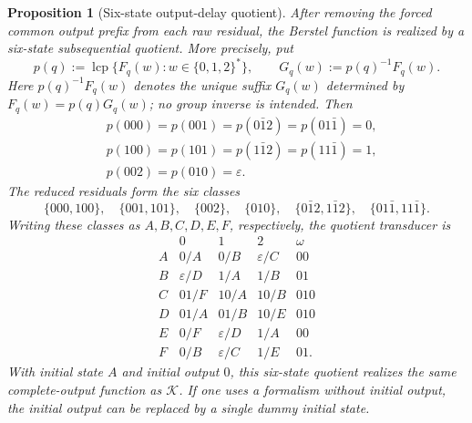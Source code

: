 \documentclass[11pt,letterpaper]{article}
\numberwithin{equation}{section}
\theoremstyle{plain}
\newtheorem{proposition}[theorem]{Proposition}
\theoremstyle{definition}
\theoremstyle{remark}
\DeclareMathOperator{\lcp}{lcp}
\begin{document}
\begin{proposition}[Six-state output-delay quotient]\label{prop:berstel-six-state-quotient}
After removing the forced common output prefix from each raw residual, the
Berstel function is realized by a six-state subsequential quotient.  More
precisely, put
\[
p(q):=\lcp\{F_q(w):w\in\{0,1,2\}^\ast\},
\qquad
G_q(w):=p(q)^{-1}F_q(w).
\]
Here $p(q)^{-1}F_q(w)$ denotes the unique suffix $G_q(w)$ determined by
$F_q(w)=p(q)G_q(w)$; no group inverse is intended.
Then
\[
\begin{aligned}
&p(000)=p(001)=p(0\bar{1}2)=p(01\bar{1})=0,\\
&p(100)=p(101)=p(1\bar{1}2)=p(11\bar{1})=1,\\
&p(002)=p(010)=\varepsilon.
\end{aligned}
\]
The reduced residuals form the six classes
\[
\{000,100\},\quad
\{001,101\},\quad
\{002\},\quad
\{010\},\quad
\{0\bar{1}2,1\bar{1}2\},\quad
\{01\bar{1},11\bar{1}\}.
\]
Writing these classes as $A,B,C,D,E,F$, respectively, the quotient
transducer is
\[
\begin{array}{c|ccc|c}
&0&1&2&\omega\\
\hline
A &0/A&0/B&\varepsilon/C&00\\
B &\varepsilon/D&1/A&1/B&01\\
C &01/F&10/A&10/B&010\\
D &01/A&01/B&10/E&010\\
E &0/F&\varepsilon/D&1/A&00\\
F &0/B&\varepsilon/C&1/E&01 .
\end{array}
\]
With initial state $A$ and initial output $0$, this six-state quotient
realizes the same complete-output function as $\mathcal K$.  If one uses a
formalism without initial output, the initial output can be replaced by a
single dummy initial state.
\end{proposition}
\end{document}
